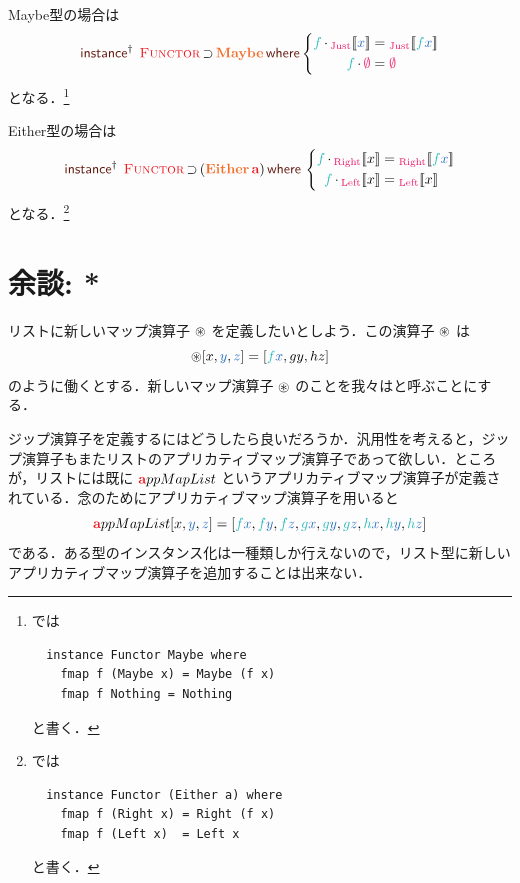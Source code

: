 \documentclass[a5paper,twoside,fleqn,draft]{jsbook}
\begin{document}
Maybe型の場合は
\begin{equation}
  \mInstanceDeclPolymorphic\;
  \hFunctor\hHasElementsOf\hMaybe
  \mWhere\left\{
  \begin{aligned}
    \hFunc{f}\mMap{}\hJustWith{\hVar{x}}&=\hJustWith{\hFunc{f}\hVar{x}}\\
    \hFunc{f}\mMap\hNothing&=\hNothing
  \end{aligned}
  \right.
\end{equation}
となる．\footnote{\haskell では
\begin{verbatim}
  instance Functor Maybe where
    fmap f (Maybe x) = Maybe (f x)
    fmap f Nothing = Nothing
\end{verbatim}
と書く．}

Either型の場合は
\begin{equation}
  \mInstanceDeclPolymorphic\;
  \hFunctor\hHasElementsOf{}(\hEither\,\hTypeName{a})
  \mWhere{}
  \left\{
  \begin{aligned}
    \hFunc{f}\mMap{}\hRightWith{x}&=\hRightWith{\hFunc{f}\hVar{x}}\\
    \hFunc{f}\mMap{}\hLeftWith{x}&=\hLeftWith{x}
  \end{aligned}
  \right.
\end{equation}
となる．\footnote{\haskell では
\begin{verbatim}
  instance Functor (Either a) where
    fmap f (Right x) = Right (f x)
    fmap f (Left x)  = Left x
\end{verbatim}
と書く．}


\section{余談: *}

リストに新しいマップ演算子 $\operatorname{\circledast}$ を定義したいとしよう．この演算子 $\operatorname{\circledast}$ は
\begin{equation}
  [\hFunc{f},\hFunc{g},\mHFunc]\mZip[x,\hVar{y},\hVar{z}]
  =[\hFunc{f}\hVar{x},gy,hz]
\end{equation}
のように働くとする．新しいマップ演算子 $\operatorname{\circledast}$ のことを我々はと呼ぶことにする．

ジップ演算子を定義するにはどうしたら良いだろうか．汎用性を考えると，ジップ演算子もまたリストのアプリカティブマップ演算子であって欲しい．ところが，リストには既に $\hTypeName{a}ppMapList$ というアプリカティブマップ演算子が定義されている．念のためにアプリカティブマップ演算子を用いると
\begin{equation}
  [\hFunc{f},\hFunc{g},\mHFunc]\hTypeName{a}ppMapList[x,\hVar{y},\hVar{z}]
  =[\hFunc{f}\hVar{x},\hFunc{f}\hVar{y},\hFunc{f}\hVar{z},\hFunc{g}\hVar{x},\hFunc{g}\hVar{y},\hFunc{g}\hVar{z},\mHFunc\hVar{x},\mHFunc\hVar{y},\mHFunc\hVar{z}]
\end{equation}
である．ある型のインスタンス化は一種類しか行えないので，リスト型に新しいアプリカティブマップ演算子を追加することは出来ない．
\end{document}
